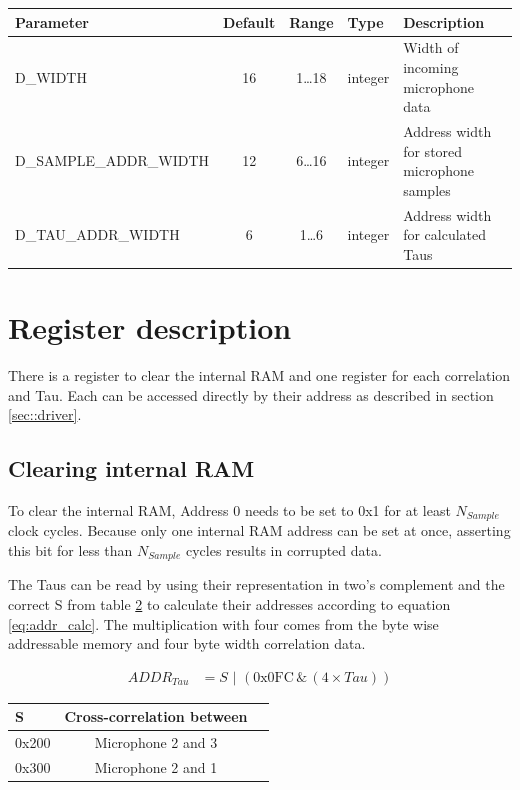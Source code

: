 \begin{table}[h]
	\centering
	\label{tbl::parameters}
	\begin{tabular}{|l|c|c|l|l|}
		\hline 
		Parameter & Default & Range & Type & Description \\ 
		\hline 
		D\_WIDTH & 16 & 1\ldots18 & integer & Width of incoming microphone data\\
		\hline 
		D\_SAMPLE\_ADDR\_WIDTH & 12 & 6\ldots16 & integer & Address width for stored microphone samples\\
		\hline 
		D\_TAU\_ADDR\_WIDTH & 6 & 1\ldots6 & integer & Address width for calculated Taus \\
		\hline 
	\end{tabular} 
\end{table}

\section{Register description}
\label{sec::registers}
There is a register to clear the internal RAM and one register for each correlation and Tau.
Each can be accessed directly by their address as described in section \ref{sec::driver}.

\subsection{Clearing internal RAM}
To clear the internal RAM, Address 0 needs to be set to 0x1 for at least $N_{Sample}$  clock cycles.
Because only one internal RAM address can be set at once, asserting this bit for less than $N_{Sample}$ cycles results in corrupted data.

The Taus can be read by using their representation in two's complement and the correct S from table \ref{tbl::tau_addr} to calculate their addresses according to equation \ref{eq:addr_calc}.
The multiplication with four comes from the byte wise addressable memory and four byte width correlation data.

\begin{align}
	ADDR_{Tau} &= S\,\,|\,\, (\text{0x0FC}\, \&\, (4\times Tau)) \label{eq:addr_calc}
\end{align}

\begin{table}[h]
	\centering
	\label{tbl::tau_addr}
	\begin{tabular}{|l|c|l|}
		\hline 
		S &  Cross-correlation between \\
		\hline 
		0x200	&  Microphone 2 and 3\\
		\hline 
		0x300	&  Microphone 2 and 1\\
		\hline 
	\end{tabular} 
\end{table}

